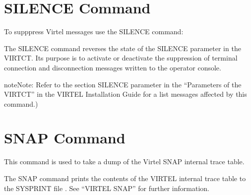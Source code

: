 \documentclass[letterpaper,10pt,english]{sphinxmanual}
\begin{document}
\newpage

\ignorespaces 

\section{SILENCE Command}
\label{\detokenize{audit_operations_ and_performance:silence-command}}\label{\detokenize{audit_operations_ and_performance:index-18}}
To supppress Virtel messages use the SILENCE command:

\begin{sphinxVerbatim}[commandchars=\\\{\}]
\end{sphinxVerbatim}

The SILENCE command reverses the state of the SILENCE parameter in the VIRTCT. Its purpose is to activate or deactivate the suppression of terminal connection and disconnection messages written to the operator console.

\begin{sphinxadmonition}{note}{Note:}
Refer to the section SILENCE parameter in the “Parameters of the VIRTCT” in the VIRTEL Installation Guide for a list messages affected by this command.)
\end{sphinxadmonition}

\ignorespaces 

\section{SNAP Command}
\label{\detokenize{audit_operations_ and_performance:snap-command}}\label{\detokenize{audit_operations_ and_performance:index-19}}
This command is used to take a dump of the Virtel SNAP internal trace table.

\begin{sphinxVerbatim}[commandchars=\\\{\}]
\end{sphinxVerbatim}

The SNAP command prints the contents of the VIRTEL internal trace table to the SYSPRINT file . See “VIRTEL SNAP” for further information.
\end{document}
